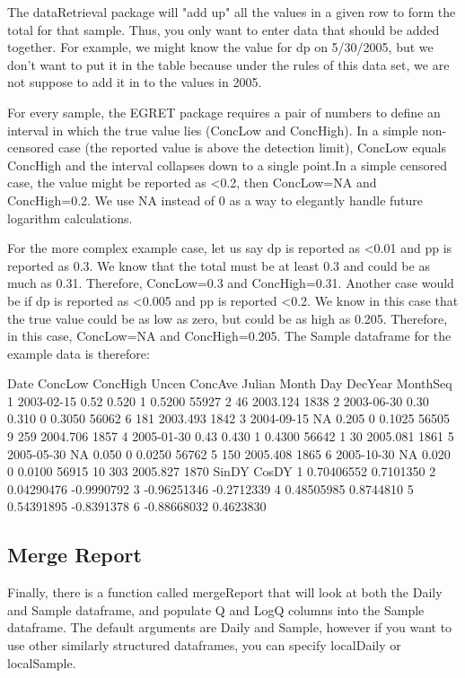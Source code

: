 \documentclass[a4paper,11pt]{article}
\begin{document}
The dataRetrieval package will "add up" all the values in a given row to form the total for that sample. Thus, you only want to enter data that should be added together. For example, we might know the value for dp on 5/30/2005, but we don't want to put it in the table because under the rules of this data set, we are not suppose to add it in to the values in 2005.

For every sample, the EGRET package requires a pair of numbers to define an interval in which the true value lies (ConcLow and ConcHigh). In a simple non-censored case (the reported value is above the detection limit), ConcLow equals ConcHigh and the interval collapses down to a single point.In a simple censored case, the value might be reported as <0.2, then ConcLow=NA and ConcHigh=0.2. We use NA instead of 0 as a way to elegantly handle future logarithm calculations.

For the more complex example case, let us say dp is reported as <0.01 and pp is reported as 0.3. We know that the total must be at least 0.3 and could be as much as 0.31. Therefore, ConcLow=0.3 and ConcHigh=0.31. Another case would be if dp is reported as <0.005 and pp is reported <0.2. We know in this case that the true value could be as low as zero, but could be as high as 0.205. Therefore, in this case, ConcLow=NA and ConcHigh=0.205. The Sample dataframe for the example data is therefore:

\begin{Schunk}
\begin{Soutput}
        Date ConcLow ConcHigh Uncen ConcAve Julian Month Day  DecYear MonthSeq
1 2003-02-15    0.52    0.520     1  0.5200  55927     2  46 2003.124     1838
2 2003-06-30    0.30    0.310     0  0.3050  56062     6 181 2003.493     1842
3 2004-09-15      NA    0.205     0  0.1025  56505     9 259 2004.706     1857
4 2005-01-30    0.43    0.430     1  0.4300  56642     1  30 2005.081     1861
5 2005-05-30      NA    0.050     0  0.0250  56762     5 150 2005.408     1865
6 2005-10-30      NA    0.020     0  0.0100  56915    10 303 2005.827     1870
        SinDY      CosDY
1  0.70406552  0.7101350
2  0.04290476 -0.9990792
3 -0.96251346 -0.2712339
4  0.48505985  0.8744810
5  0.54391895 -0.8391378
6 -0.88668032  0.4623830
\end{Soutput}
\end{Schunk}

\subsection{Merge Report}
Finally, there is a function called mergeReport that will look at both the Daily and Sample dataframe, and populate Q and LogQ columns into the Sample dataframe. The default arguments are Daily and Sample, however if you want to use other similarly structured dataframes, you can specify localDaily or localSample.
\end{document}
